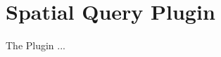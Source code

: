 
\section{Spatial Query Plugin}\label{sec:spatial_query}

\updatedisclaimer

The  Plugin ...

\FloatBarrier
